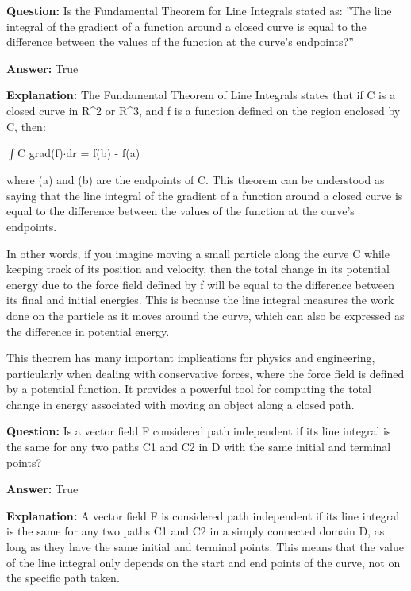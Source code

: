 \documentclass{article}
\begin{document}
                \vspace{0.5cm} 
        
            
                \textbf {Question:} Is the Fundamental Theorem for Line Integrals stated as: ''The line integral of the gradient of a function around a closed curve is equal to the difference between the values of the function at the curve's endpoints?''
                
                \textbf{Answer:} True

                \textbf{Explanation:} The Fundamental Theorem of Line Integrals states that if C is a closed curve in R{\textasciicircum}2 or R{\textasciicircum}3, and f is a function defined on the region enclosed by C, then:

\ensuremath{\int}C grad(f)\ensuremath{\cdot}dr = f(b) - f(a)

where (a) and (b) are the endpoints of C. This theorem can be understood as saying that the line integral of the gradient of a function around a closed curve is equal to the difference between the values of the function at the curve's endpoints.

In other words, if you imagine moving a small particle along the curve C while keeping track of its position and velocity, then the total change in its potential energy due to the force field defined by f will be equal to the difference between its final and initial energies. This is because the line integral measures the work done on the particle as it moves around the curve, which can also be expressed as the difference in potential energy.

This theorem has many important implications for physics and engineering, particularly when dealing with conservative forces, where the force field is defined by a potential function. It provides a powerful tool for computing the total change in energy associated with moving an object along a closed path.
                
                \vspace{0.5cm} 
        
            
                \textbf {Question:} Is a vector field F considered path independent if its line integral is the same for any two paths C1 and C2 in D with the same initial and terminal points?
                
                \textbf{Answer:} True

                \textbf{Explanation:} A vector field F is considered path independent if its line integral is the same for any two paths C1 and C2 in a simply connected domain D, as long as they have the same initial and terminal points. This means that the value of the line integral only depends on the start and end points of the curve, not on the specific path taken.
\end{document}
